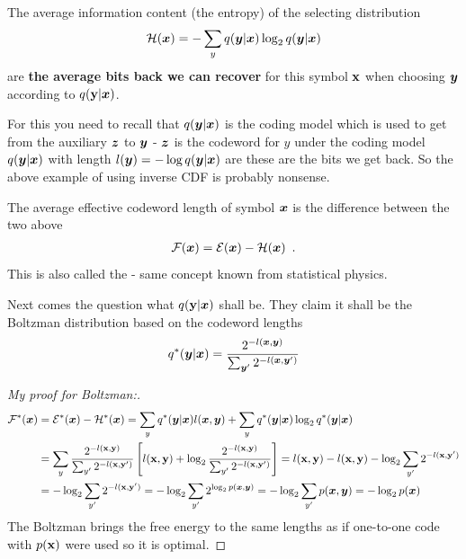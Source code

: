 The average information content (the entropy) of the selecting distribution
\begin{align}
\mathcal{H}({\bm{x}}) = - \sum_y q({\bm{y}} | {\bm{x}}) \log_2 q({\bm{y}} | {\bm{x}})
\end{align}
are \textbf{the average bits back we can recover} for this symbol ${\mathbf{x}}$ when choosing ${\bm{y}}$ according to $q({\mathbf{y}} | {\bm{x}})$.

\begin{notebox}[colback=yellow!5]
For this you need to recall that $q({\bm{y}} | {\bm{x}})$ is the coding model which is used to get from the auxiliary ${\bm{z}}$ to ${\bm{y}}$ - ${\bm{z}}$ is the codeword for $y$ under the coding model $q({\bm{y}} | {\bm{x}})$ with length $l({\bm{y}}) = - \log q({\bm{y}} | {\bm{x}})$ are these are the bits we get back.
So the above example of using inverse CDF is probably nonsense.
\end{notebox}


The average effective codeword length of symbol ${\bm{x}}$ is the difference between the two above
\begin{align}
\mathcal{F}({\bm{x}}) = \mathcal{E}({\bm{x}}) - \mathcal{H}({\bm{x}}) \enspace .
\end{align}
This is also called the \textbf{} - same concept known from statistical physics.

Next comes the question what $q({\mathbf{y}} | {\bm{x}})$ shall be.
They claim it shall be the Boltzman distribution based on the codeword lengths
\begin{align}
q^*({\bm{y}} | {\bm{x}}) = \frac{2^{-l({\bm{x}}, {\bm{y}})}}{\sum_{{\bm{y}}'} 2^{-l({\bm{x}}, {\bm{y}}')}}
\end{align}

\begin{proof}[My proof for Boltzman:]
\begin{align*}
\mathcal{F^*}({\bm{x}}) & = \mathcal{E^*}({\bm{x}}) - \mathcal{H^*}({\bm{x}})
= \sum_y q^*({\bm{y}} | {\bm{x}}) l({\bm{x}}, {\bm{y}}) + \sum_y q^*({\bm{y}} | {\bm{x}}) \log_2 q^*({\bm{y}} | {\bm{x}}) \\
& = \sum_y \frac{2^{-l({\mathbf{x}}, {\mathbf{y}})}}{\sum_{y'} 2^{-l({\mathbf{x}}, {\mathbf{y}}')}} \left[l({\mathbf{x}}, {\mathbf{y}}) + \log_2 \frac{2^{-l({\mathbf{x}}, {\mathbf{y}})}}{\sum_{y'} 2^{-l({\mathbf{x}}, {\mathbf{y}}')}}\right] 
= l({\mathbf{x}}, {\mathbf{y}}) - l({\mathbf{x}}, {\mathbf{y}}) - \log_2 \sum_{y'} 2^{-l({\mathbf{x}}, {\mathbf{y}}')} \\
& = - \log_2 \sum_{y'} 2^{-l({\mathbf{x}}, {\mathbf{y}}')} = 
- \log_2 \sum_{y'} 2^{\log_2 p({\bm{x}}, {\bm{y}})} =
- \log_2 \sum_{y'} p({\bm{x}}, {\bm{y}}) = - \log_2 p({\bm{x}})
\end{align*}
The Boltzman brings the free energy to the same lengths as if one-to-one code with $p({\mathbf{x}})$ were used so it is optimal.
\end{proof}

